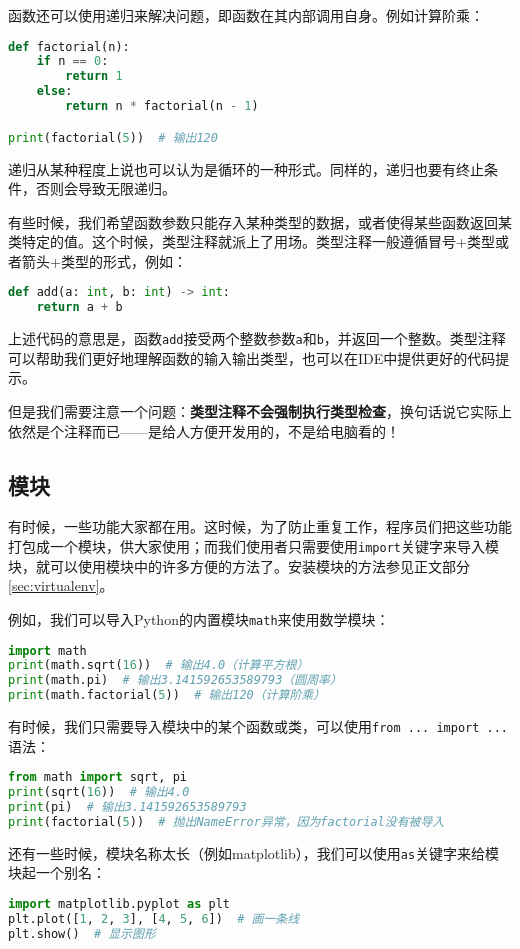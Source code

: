 函数还可以使用递归来解决问题，即函数在其内部调用自身。例如计算阶乘：
\begin{lstlisting}[language=python]
def factorial(n):
    if n == 0:
        return 1
    else:
        return n * factorial(n - 1)

print(factorial(5))  # 输出120
\end{lstlisting}

递归从某种程度上说也可以认为是循环的一种形式。同样的，递归也要有终止条件，否则会导致无限递归。

有些时候，我们希望函数参数只能存入某种类型的数据，或者使得某些函数返回某类特定的值。这个时候，类型注释就派上了用场。类型注释一般遵循冒号+类型或者箭头+类型的形式，例如：
\begin{lstlisting}[language=python]
def add(a: int, b: int) -> int:
    return a + b
\end{lstlisting}
上述代码的意思是，函数\texttt{add}接受两个整数参数\texttt{a}和\texttt{b}，并返回一个整数。类型注释可以帮助我们更好地理解函数的输入输出类型，也可以在IDE中提供更好的代码提示。

但是我们需要注意一个问题：\textbf{类型注释不会强制执行类型检查}，换句话说它实际上依然是个注释而已——是给人方便开发用的，不是给电脑看的！

\subsection{模块}
有时候，一些功能大家都在用。这时候，为了防止重复工作，程序员们把这些功能打包成一个模块，供大家使用；而我们使用者只需要使用\texttt{import}关键字来导入模块，就可以使用模块中的许多方便的方法了。安装模块的方法参见正文部分\ref{sec:virtualenv}。

例如，我们可以导入Python的内置模块\texttt{math}来使用数学模块：
\begin{lstlisting}[language=python]
import math
print(math.sqrt(16))  # 输出4.0（计算平方根）
print(math.pi)  # 输出3.141592653589793（圆周率）
print(math.factorial(5))  # 输出120（计算阶乘）
\end{lstlisting}

有时候，我们只需要导入模块中的某个函数或类，可以使用\texttt{from ... import ...}语法：
\begin{lstlisting}[language=python]
from math import sqrt, pi
print(sqrt(16))  # 输出4.0
print(pi)  # 输出3.141592653589793
print(factorial(5))  # 抛出NameError异常，因为factorial没有被导入
\end{lstlisting}

还有一些时候，模块名称太长（例如matplotlib），我们可以使用\texttt{as}关键字来给模块起一个别名：
\begin{lstlisting}[language=python]
import matplotlib.pyplot as plt
plt.plot([1, 2, 3], [4, 5, 6])  # 画一条线
plt.show()  # 显示图形
\end{lstlisting}


